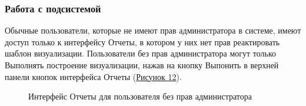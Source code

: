 \documentclass[a4paper]{extarticle}
\begin{document}
\subsubsection{Работа с подсистемой}
Обычные пользователи, которые не имеют прав администратора в системе, имеют доступ только к интерфейсу Отчеты, в котором у них нет прав реактировать шаблон визуализации. Пользователи без прав администратора могут только Выполнять построение визуализации, нажав на кнопку Выпонить в верхней панели кнопок интерфейса Отчеты (\hyperref[ris7]{Рисунок 12}).
\begin{figure}[H]
\caption{Интерфейс Отчеты для пользователя без прав администратора}
\label{ris7}
\end{figure}\par
\end{document}
